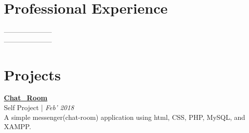 \documentclass[margin,line]{res}
\newenvironment{list2}{
  \begin{list}{$\bullet$}{%
      \setlength{\itemsep}{0in}
      \setlength{\parsep}{0in} \setlength{\parskip}{0in}
      \setlength{\topsep}{0in} \setlength{\partopsep}{0in}
      \setlength{\leftmargin}{0.2in}}}{\end{list}}
\begin{document}
\begin{resume}
\section{\sc Professional Experience}
---------------------\\
---------------------
\fi
\iffalse
{\bf Institution}, City, State. Country. \hfill{August 2008 -- Present}\\
{\em First Job Name}\hfill {Summer 2011, June 2011 -- July 2011}\\
\begin{list2} %
\item Responsible for XYZ \\
\item Responsible for ABC\\
\end{list2}
{\em Second Job Name}\hfill {August 2009 -- January 2010}\\
\begin{list2} %
\item Responsible for XYZ \\
\item Responsible for ABC\\
\end{list2}
{\bf Institution 2}, City, State. Country. \hfill{August 2008 -- Present}\\
{\em First Job Name}\hfill {Summer 2011, June 2011 -- July 2011}\\
\begin{list2} %
\item Responsible for XYZ \\
\item Responsible for ABC\\
\end{list2}
{\em Second Job Name}\hfill {August 2009 -- January 2010}\\
\begin{list2} %
\item Responsible for XYZ \\
\item Responsible for ABC\\
\end{list2}
\fi
\section{\sc Projects}
\href{https://github.com/PurveshMakode24/Chat_Room}{\bf Chat\_Room} \\
{\small Self Project |} {\em \small Feb' 2018 }\\
A simple messenger(chat-room) application using html, CSS, PHP, MySQL, and XAMPP.


\end{resume}
\end{document}
